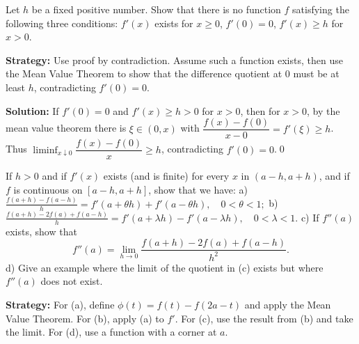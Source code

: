 \begin{problembox}
\begin{problemstatement}
Let \( h \) be a fixed positive number. Show that there is no function \( f \) satisfying the following three conditions: \( f'(x) \) exists for \( x \geq 0 \), \( f'(0) = 0 \), \( f'(x) \geq h \) for \( x > 0 \).
\end{problemstatement}
\end{problembox}

\noindent\textbf{Strategy:} Use proof by contradiction. Assume such a function exists, then use the Mean Value Theorem to show that the difference quotient at 0 must be at least \( h \), contradicting \( f'(0) = 0 \).

\bigskip\noindent\textbf{Solution:}
If $f'(0)=0$ and $f'(x)\ge h>0$ for $x>0$, then for $x>0$, by the mean value theorem there is $\xi\in(0,x)$ with $\dfrac{f(x)-f(0)}{x-0}=f'(\xi)\ge h$. Thus $\liminf_{x\downarrow 0}\dfrac{f(x)-f(0)}{x}\ge h$, contradicting $f'(0)=0$.\qed


\begin{problembox}
\begin{problemstatement}
If \( h > 0 \) and if \( f'(x) \) exists (and is finite) for every \( x \) in \( (a - h, a + h) \), and if \( f \) is continuous on \( [a - h, a + h] \), show that we have:
a) \( \frac{f(a + h) - f(a - h)}{h} = f'(a + \theta h) + f'(a - \theta h), \quad 0 < \theta < 1; \)
b) \( \frac{f(a + h) - 2f(a) + f(a - h)}{h} = f'(a + \lambda h) - f'(a - \lambda h), \quad 0 < \lambda < 1. \)
c) If \( f''(a) \) exists, show that
\[ f''(a) = \lim_{h \to 0} \frac{f(a + h) - 2f(a) + f(a - h)}{h^2}. \]
d) Give an example where the limit of the quotient in (c) exists but where \( f''(a) \) does not exist.
\end{problemstatement}
\end{problembox}

\noindent\textbf{Strategy:} For (a), define \( \phi(t) = f(t) - f(2a - t) \) and apply the Mean Value Theorem. For (b), apply (a) to \( f' \). For (c), use the result from (b) and take the limit. For (d), use a function with a corner at \( a \).

